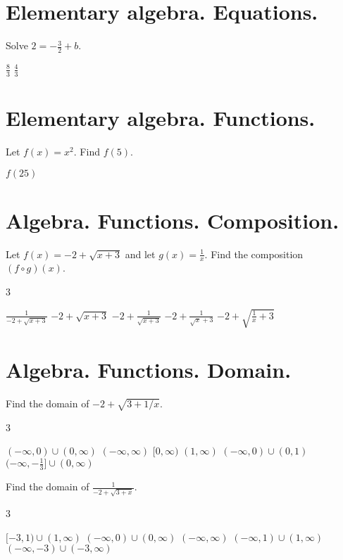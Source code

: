 \documentclass[addpoints]{exam}
\begin{document}
\begin{questions}
\section{Elementary algebra. Equations.}
\question Solve $2=-\frac32+b$. \qquad\qquad
\begin{oneparchoices}
	\correctchoice $\frac83$
	\choice $\frac43$
	\end{oneparchoices}

\section{Elementary algebra. Functions.}
\question Let $f(x) = x^2$. Find $f(5)$.
\begin{oneparchoices}
	\choice $f(25)$
	\end{oneparchoices}

\section{Algebra. Functions. Composition.}
\question Let $f(x) = -2+\sqrt{x+3}$ and let $g(x) = \frac1x$. Find the composition $(f\circ g)(x)$.
\begin{multicols}3
\begin{choices}
	\choice $\frac1{-2+\sqrt{x+3}}$
	\choice $-2+\sqrt{x+3}$
	\choice $-2+\frac1{\sqrt{x+3}}$
	\choice $-2+\frac1{\sqrt x+3}$
	\correctchoice $-2+\sqrt{\frac1x+3}$
	\end{choices}
	\end{multicols}

\section{Algebra. Functions. Domain.}
\question Find the domain of $-2+\sqrt{3+1/x}$.
\begin{multicols}3
\begin{choices}
	\choice $(-\infty,0)\cup(0,\infty)$ %
	\choice $(-\infty,\infty)$ %
	\choice $[0,\infty)$ %
	\choice $(1,\infty)$ %
	\choice $(-\infty,0)\cup(0,1)$ %
	\correctchoice $(-\infty,-\tfrac13]\cup(0,\infty)$ %
	\end{choices}
	\end{multicols}
\question Find the domain of $\frac1{-2+\sqrt{3+x}}$.
\begin{multicols}3
\begin{choices}
	\correctchoice $[-3,1)\cup(1,\infty)$
	\choice $(-\infty,0)\cup(0,\infty)$
	\choice $(-\infty,\infty)$
	\choice $(-\infty,1)\cup(1,\infty)$
	\choice $(-\infty,-3)\cup(-3,\infty)$
	\end{choices}
	\end{multicols}


\end{questions}
\end{document}
